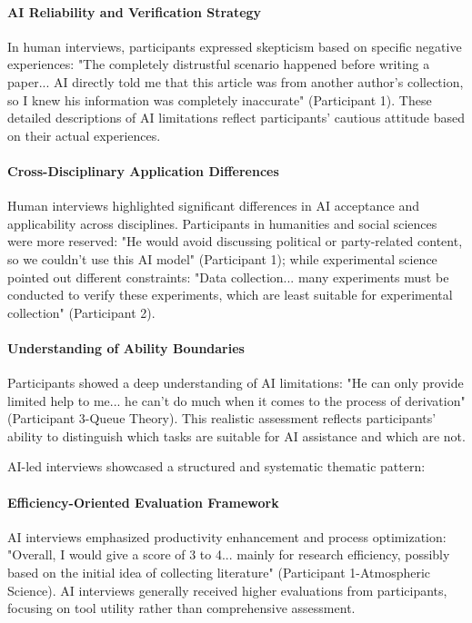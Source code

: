 \documentclass[sigchi,nonacm,manuscript]{acmart}
\begin{document}
\paragraph{AI Reliability and Verification Strategy} In human interviews, participants expressed skepticism based on specific negative experiences: "The completely distrustful scenario happened before writing a paper... AI directly told me that this article was from another author's collection, so I knew his information was completely inaccurate" (Participant 1). These detailed descriptions of AI limitations reflect participants' cautious attitude based on their actual experiences.

\paragraph{Cross-Disciplinary Application Differences} Human interviews highlighted significant differences in AI acceptance and applicability across disciplines. Participants in humanities and social sciences were more reserved: "He would avoid discussing political or party-related content, so we couldn't use this AI model" (Participant 1); while experimental science pointed out different constraints: "Data collection... many experiments must be conducted to verify these experiments, which are least suitable for experimental collection" (Participant 2).

\paragraph{Understanding of Ability Boundaries} Participants showed a deep understanding of AI limitations: "He can only provide limited help to me... he can't do much when it comes to the process of derivation" (Participant 3-Queue Theory). This realistic assessment reflects participants' ability to distinguish which tasks are suitable for AI assistance and which are not.

AI-led interviews showcased a structured and systematic thematic pattern:

\paragraph{Efficiency-Oriented Evaluation Framework} AI interviews emphasized productivity enhancement and process optimization: "Overall, I would give a score of 3 to 4... mainly for research efficiency, possibly based on the initial idea of collecting literature" (Participant 1-Atmospheric Science). AI interviews generally received higher evaluations from participants, focusing on tool utility rather than comprehensive assessment.
\end{document}
